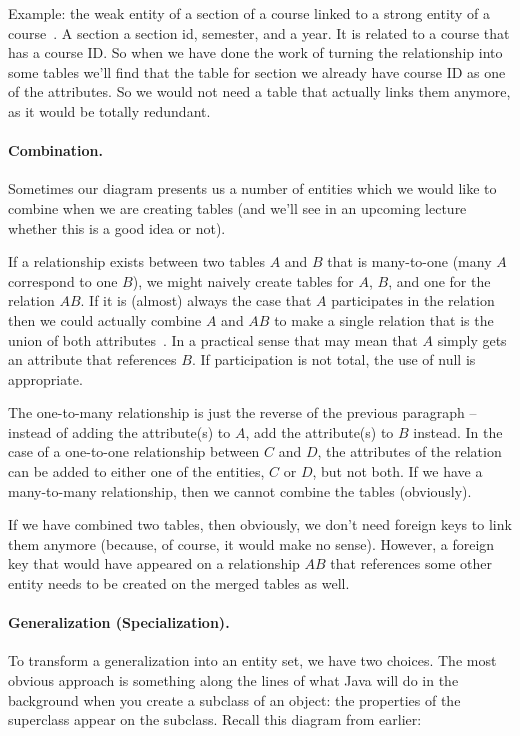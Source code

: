 Example: the weak entity of a section of a course linked to a strong entity of a course~\cite{dsc}. A section a section id, semester, and a year. It is related to a course that has a course ID. So when we have done the work of turning the relationship into some tables we'll find that the table for section we already have course ID as one of the attributes. So we would not need a table that actually links them anymore, as it would be totally redundant. 

\paragraph{Combination.}
Sometimes our diagram presents us a number of entities which we would like to combine when we are creating tables (and we'll see in an upcoming lecture whether this is a good idea or not). 

If a relationship exists between two tables $A$ and $B$ that is many-to-one (many $A$ correspond to one $B$), we might naively create tables for $A$, $B$, and one for the relation $AB$. If it is (almost) always the case that $A$ participates in the relation then we could actually combine $A$ and $AB$ to make a single relation that is the union of both attributes~\cite{dsc}. In a practical sense that may mean that $A$ simply gets an attribute that references $B$. If participation is not total, the use of null is appropriate.

The one-to-many relationship is just the reverse of the previous paragraph -- instead of adding the attribute(s) to $A$, add the attribute(s) to $B$ instead. In the case of a one-to-one relationship between $C$ and $D$, the attributes of the relation can be added to either one of the entities, $C$ or $D$, but not both. If we have a many-to-many relationship, then we cannot combine the tables (obviously). 

If we have combined two tables, then obviously, we don't need foreign keys to link them anymore (because, of course, it would make no sense). However, a foreign key that would have appeared on a relationship $AB$ that references some other entity needs to be created on the merged tables as well.

\paragraph{Generalization (Specialization).} To transform a generalization into an entity set, we have two choices. The most obvious approach is something along the lines of what Java will do in the background when you create a subclass of an object: the properties of the superclass appear on the subclass. Recall this diagram from earlier:


